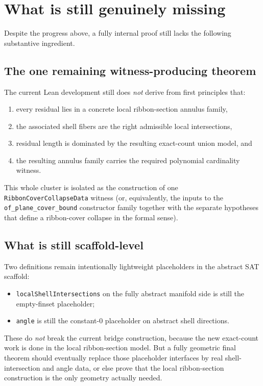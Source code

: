 \documentclass[11pt]{article}
\begin{document}
\section{What is still genuinely missing}

Despite the progress above, a fully internal proof still lacks the following substantive ingredient.

\subsection{The one remaining witness-producing theorem}

The current Lean development still does \emph{not} derive from first principles that:

\begin{enumerate}[leftmargin=2em]
  \item every residual lies in a concrete local ribbon-section annulus family,
  \item the associated shell fibers are the right admissible local intersections,
  \item residual length is dominated by the resulting exact-count union model, and
  \item the resulting annulus family carries the required polynomial cardinality witness.
\end{enumerate}

This whole cluster is isolated as the construction of one \texttt{RibbonCoverCollapseData}
witness (or, equivalently, the inputs to the \texttt{of\_plane\_cover\_bound} constructor family
together with the separate hypotheses that define a ribbon-cover collapse in the formal sense).

\subsection{What is still scaffold-level}

Two definitions remain intentionally lightweight placeholders in the abstract SAT scaffold:

\begin{itemize}[leftmargin=2em]
  \item \texttt{localShellIntersections} on the fully abstract manifold side is still the empty-finset placeholder;
  \item \texttt{angle} is still the constant-\(0\) placeholder on abstract shell directions.
\end{itemize}

These do \emph{not} break the current bridge construction, because the new exact-count work is done in
the local ribbon-section model. But a fully geometric final theorem should eventually replace those
placeholder interfaces by real shell-intersection and angle data, or else prove that the local ribbon-section
construction is the only geometry actually needed.
\end{document}
